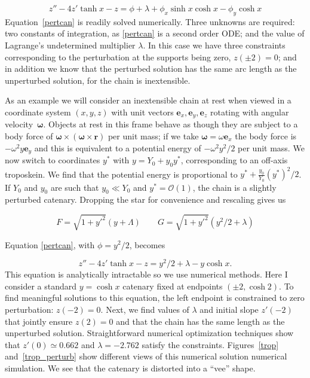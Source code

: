 \documentclass[pdflatex,sn-mathphys-num]{sn-jnl}%
\theoremstyle{thmstyleone}%
\theoremstyle{thmstyletwo}%
\theoremstyle{thmstylethree}%
\begin{document}
\begin{equation}\label{pertcan}
  z'' - 4z'\tanh x - z =
  \phi + \lambda + \phi_x\sinh x\cosh x - \phi_y\cosh x
\end{equation}
%
Equation~\ref{pertcan} is readily solved numerically.  Three unknowns
are required: two constants of integration, as \ref{pertcan} is a
second order ODE; and the value of Lagrange's undetermined multiplier
$\lambda$.  In this case we have three constraints corresponding to
the perturbation at the supports being zero, $z(\pm 2)=0$; and in
addition we know that the perturbed solution has the same arc length
as the unperturbed solution, for the chain is inextensible.

As an example we will consider an inextensible chain at rest when
viewed in a coordinate system $(x,y,z)$ with unit vectors
$\boldsymbol{e}_x,\boldsymbol{e}_y,\boldsymbol{e}_z$ rotating with
angular velocity~$\boldsymbol{\omega}$.  Objects at rest in this frame
behave as though they are subject to a body force of
$\boldsymbol{\omega}\times\left(\boldsymbol{\omega}\times\boldsymbol{r}\right)$
per unit mass; if we take $\boldsymbol{\omega}=\omega\boldsymbol{e}_x$
the body force is $-\omega^2y\boldsymbol{e}_y$ and this is equivalent
to a potential energy of $-\omega^2y^2/2$ per unit mass.  We now
switch to coordinates $y^*$ with $y = Y_0 + y_0y^*$, corresponding to
an off-axis troposkein.  We find that the potential energy is
proportional to $y^* +
\frac{y_0}{Y_0}\left(y^*\right)^2/2$.  If
$Y_0$ and $y_0$ are such that $y_0\ll Y_0$ and $y^*={\mathcal O}(1)$,
the chain is a slightly perturbed catenary.  Dropping the star for
convenience and rescaling gives us

\begin{equation}
  F = \sqrt{1+y'^2}(y+\Lambda)\qquad
  G = \sqrt{1+y'^2}(y^2/2 + \lambda)
\end{equation}

Equation \ref{pertcan}, with $\phi=y^2/2$, becomes

\begin{equation}
  z'' - 4z'\tanh x - z = y^2/2 + \lambda -y\cosh x.
\end{equation}
%
This equation is analytically intractable so we use numerical methods.
Here I consider a standard $y=\cosh x$ catenary fixed at endpoints
$(\pm 2, \cosh 2)$.  To find meaningful solutions to this equation,
the left endpoint is constrained to zero perturbation: $z(-2)=0$.
Next, we find values of $\lambda$ and initial slope $z'(-2)$ that
jointly ensure $z(2)=0$ and that the chain has the same length as the
unperturbed solution.  Straightforward numerical optimization
techniques show that $z'(0)\simeq 0.662$ and $\lambda = -2.762$ satisfy
the constraints.  Figures~\ref{trop} and~\ref{trop_perturb} show
different views of this numerical solution numerical simulation.  We
see that the catenary is distorted into a ``vee'' shape.
\end{document}

